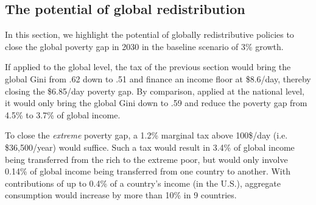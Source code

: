 \subsection{The potential of global redistribution} %

In this section, we highlight the potential of globally redistributive policies to close the global poverty gap in 2030 in the baseline scenario of 3\% growth. %

If applied to the global level, the tax of the previous section would bring the global Gini from .62 down to .51 and finance an income floor at \$8.6/day, thereby closing the \$6.85/day poverty gap. By comparison, applied at the national level, it would only bring the global Gini down to .59 and reduce the poverty gap from 4.5\% to 3.7\% of global income. 

To close the \textit{extreme} poverty gap, a 1.2\% marginal tax %
above 100\$/day (i.e. \$36,500/year) would suffice. %
Such a tax would result in 3.4\% of global income being transferred from the rich to the extreme poor, but would only involve 0.14\% of global income being transferred from one country to another. 
With contributions of up to 0.4\% of a country's income (in the U.S.), aggregate consumption would increase by more than 10\% in 9 countries. 


